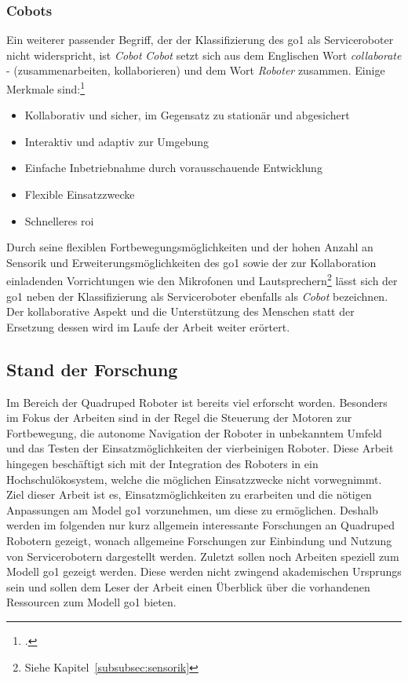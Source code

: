\subsubsection{Cobots}

Ein weiterer passender Begriff, der der Klassifizierung des \gls{go1} als Serviceroboter nicht widerspricht, ist \emph{Cobot}
\emph{Cobot} setzt sich aus dem Englischen Wort \emph{collaborate} - (zusammenarbeiten, kollaborieren) und dem Wort \emph{Roboter}
zusammen.
Einige Merkmale sind:\footcite{statista_robotics_market}

\begin{itemize}
    \item Kollaborativ und sicher, im Gegensatz zu stationär und abgesichert
    \item Interaktiv und adaptiv zur Umgebung
    \item Einfache Inbetriebnahme durch vorausschauende Entwicklung
    \item Flexible Einsatzzwecke
    \item Schnelleres \gls{roi}
\end{itemize}

Durch seine flexiblen Fortbewegungsmöglichkeiten und der hohen Anzahl an Sensorik und Erweiterungsmöglichkeiten des \gls{go1}
sowie der zur Kollaboration einladenden Vorrichtungen wie den Mikrofonen und Lautsprechern\footnote{Siehe Kapitel~\ref{subsubsec:sensorik}}
lässt sich der \gls{go1} neben der Klassifizierung als Serviceroboter ebenfalls als \emph{Cobot} bezeichnen.
Der kollaborative Aspekt und die Unterstützung des Menschen statt der Ersetzung dessen wird im Laufe der Arbeit weiter erörtert.

\subsection{Stand der Forschung}
\label{subsec:stand-der-forschung}

Im Bereich der Quadruped Roboter ist bereits viel erforscht worden.
Besonders im Fokus der Arbeiten sind in der Regel die Steuerung der Motoren zur Fortbewegung, die autonome Navigation
der Roboter in unbekanntem Umfeld und das Testen der Einsatzmöglichkeiten der vierbeinigen Roboter.
Diese Arbeit hingegen beschäftigt sich mit der Integration des Roboters in ein Hochschulökosystem, welche die möglichen Einsatzzwecke
nicht vorwegnimmt.
Ziel dieser Arbeit ist es, Einsatzmöglichkeiten zu erarbeiten und die nötigen Anpassungen am Model \gls{go1} vorzunehmen,
um diese zu ermöglichen.
Deshalb werden im folgenden nur kurz allgemein interessante Forschungen an Quadruped Robotern gezeigt, wonach
allgemeine Forschungen zur Einbindung und Nutzung von Servicerobotern dargestellt werden.
Zuletzt sollen noch Arbeiten speziell zum Modell \gls{go1} gezeigt werden.
Diese werden nicht zwingend akademischen Ursprungs sein und sollen dem Leser der Arbeit einen Überblick über die vorhandenen
Ressourcen zum Modell \gls{go1} bieten.

